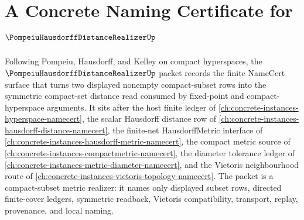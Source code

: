 \chapter{A Concrete Naming Certificate for $\PompeiuHausdorffDistanceRealizerUp$}
\label{ch:concrete-instances-pompeiu-hausdorff-distance-realizer-namecert}

Following Pompeiu, Hausdorff, and Kelley on compact hyperspaces, the $\PompeiuHausdorffDistanceRealizerUp$ packet records the finite NameCert surface that turns two displayed nonempty compact-subset rows into the symmetric compact-set distance read consumed by fixed-point and compact-hyperspace arguments. It sits after the host finite ledger of \autoref{ch:concrete-instances-hyperspace-namecert}, the scalar Hausdorff distance row of \autoref{ch:concrete-instances-hausdorff-distance-namecert}, the finite-net HausdorffMetric interface of \autoref{ch:concrete-instances-hausdorff-metric-namecert}, the compact metric source of \autoref{ch:concrete-instances-compactmetric-namecert}, the diameter tolerance ledger of \autoref{ch:concrete-instances-metric-diameter-namecert}, and the Vietoris neighbourhood route of \autoref{ch:concrete-instances-vietoris-topology-namecert}. The packet is a compact-subset metric realizer: it names only displayed subset rows, directed finite-cover ledgers, symmetric readback, Vietoris compatibility, transport, replay, provenance, and local naming.

